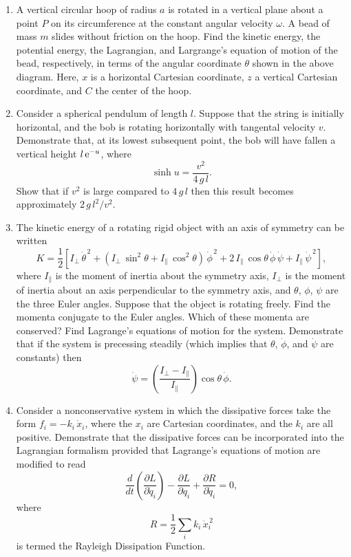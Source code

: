 {\begin{enumerate}
\epsfysize=1.75in
\centerline{}
\item A vertical circular hoop of radius $a$ is rotated in a vertical plane about a point $P$ on its
circumference at the constant angular velocity $\omega$. A bead of
mass $m$ slides without friction on the hoop. Find the kinetic energy, the potential energy, the Lagrangian, and Largrange's equation
of motion of the bead, respectively,  in terms of the angular coordinate $\theta$
shown in the above diagram. Here, $x$ is a horizontal Cartesian coordinate,
$z$ a vertical Cartesian coordinate, and $C$  the center of the hoop.

\item Consider a spherical pendulum of length $l$. Suppose that the string is initially horizontal, and the bob is rotating horizontally with tangental velocity $v$. Demonstrate that, at its lowest subsequent point, the bob will have fallen a vertical height $l\,{\rm e}^{-u}$,
where
$$
\sinh u = \frac{v^2}{4\,g\,l}.
$$
Show that if $v^2$ is large compared to $4\,g\,l$ then this result becomes approximately
$2\,g\,l^2/v^2$. 

\item The kinetic energy of a rotating rigid object with an axis of symmetry
can be written
$$
K = \frac{1}{2}\left[I_\perp\,\dot{\theta}^{\,2} + (I_\perp\,\sin^2\theta + I_\parallel\,\cos^2\theta)\,\dot{\phi}^{\,2} + 2\,I_\parallel\,\cos\theta\,\dot{\phi}\,\dot{\psi} + I_\parallel\,\dot{\psi}^{\,2}\right],
$$
where $I_\parallel$ is the  moment of inertia about the symmetry axis,
$I_\perp$ is the moment of inertia about an axis perpendicular to the symmetry axis, and $\theta$, $\phi$, $\psi$ are the three Euler angles.
Suppose that the object is rotating freely.
Find the momenta conjugate to the Euler angles. Which of these
momenta are conserved? Find Lagrange's equations of motion for the
system. Demonstrate that if the system is precessing steadily (which
implies that $\theta$, $\dot{\phi}$, and $\dot{\psi}$ are constants) then
$$
\dot{\psi} = \left(\frac{I_\perp-I_\parallel}{I_\parallel}\right)\cos\theta\,\dot{\phi}.
$$

\item Consider a nonconservative system in which the 
dissipative forces take the form $f_i = -k_i\,\dot{x}_i$, where the $x_i$
are Cartesian coordinates, and the $k_i$ are all positive. Demonstrate that
the dissipative forces can be incorporated into the Lagrangian formalism 
provided that Lagrange's equations of motion are modified to read
$$
\frac{d}{dt}\left(\frac{\partial L}{\partial \dot{q}_i}\right) - \frac{\partial L}{\partial q_i} + \frac{\partial R}{\partial \dot{q}_i}=0,
$$
where
$$
R = \frac{1}{2} \sum_i k_i\,\dot{x}_i^{\,2}
$$
is termed the Rayleigh Dissipation Function.
\end{enumerate}
}